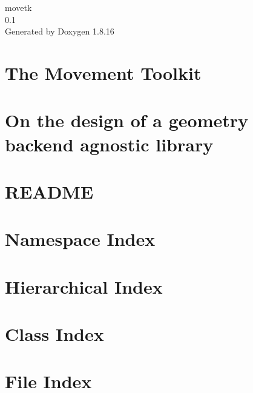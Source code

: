 \let\mypdfximage\pdfximage\def\pdfximage{\immediate\mypdfximage}\documentclass[twoside]{book}
\newcommand{\+}{\discretionary{\mbox{\scriptsize$\hookleftarrow$}}{}{}}
\newcommand{\clearemptydoublepage}{%
  \newpage{\pagestyle{empty}\cleardoublepage}%
}
\begin{document}
\hypersetup{pageanchor=false,
             bookmarksnumbered=true,
             pdfencoding=unicode
            }
\begin{titlepage}
\vspace*{7cm}
\begin{center}%
{\Large movetk \\[1ex]\large 0.\+1 }\\
\vspace*{1cm}
{\large Generated by Doxygen 1.8.16}\\
\end{center}
\end{titlepage}
\clearemptydoublepage
{}
\tableofcontents
\clearemptydoublepage
{}
\hypersetup{pageanchor=true}

\chapter{The Movement Toolkit}
\label{index}\hypertarget{index}{}
\chapter{On the design of a geometry backend agnostic library}
\label{_geom_backend_design}

\chapter{R\+E\+A\+D\+ME}
\label{md___users_amitra__documents_movetk_src_include_third_party_miniball__r_e_a_d_m_e}

\chapter{Namespace Index}

\chapter{Hierarchical Index}

\chapter{Class Index}

\chapter{File Index}

\end{document}

